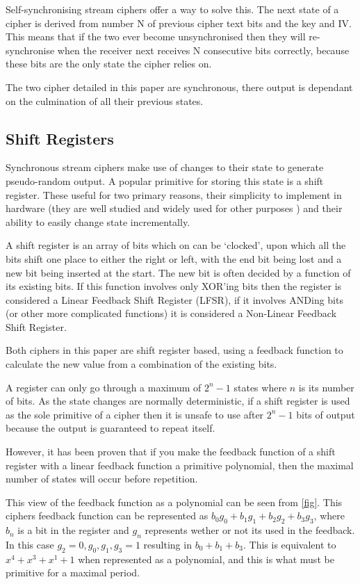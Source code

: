 \documentclass{report}
\let\Oldsubsection\subsection
\renewcommand{\subsection}{\FloatBarrier\Oldsubsection}
\begin{document}
Self-synchronising stream ciphers offer a way to solve this. The next state of a cipher is derived from number N of previous cipher text bits and the key and IV. This means that if the two ever become unsynchronised then they will re-synchronise when the receiver next receives N consecutive bits correctly, because these bits are the only state the cipher relies on.

The two cipher detailed in this paper are synchronous, there output is dependant  on the culmination of all their previous states.

\subsection*{Shift Registers}
Synchronous stream ciphers make use of changes to their state to generate pseudo-random output. A popular primitive for storing this state is a shift register. These useful for two primary reasons, their simplicity to implement in hardware (they are well studied and widely used for other purposes\cite{}
) and their ability to easily change state incrementally.

A shift register is an array of bits which on can be `clocked', upon which all the bits shift one place to either the right or left, with the end bit being lost and a new bit being inserted at the start. The new bit is often decided by a function of its existing bits. If this function involves only XOR'ing bits then the register is considered a Linear Feedback Shift Register (LFSR), if it involves ANDing bits (or other more complicated functions) it is considered a Non-Linear Feedback Shift Register.

Both ciphers in this paper are shift register based, using a feedback function to calculate the new value from a combination of the existing bits.

A register can only go through a maximum of $2^n-1$ states where $n$ is its number of bits. As the state changes are normally deterministic, if a shift register is used as the sole primitive of a cipher then it is unsafe to use after $2^n-1$ bits of output because the output is guaranteed to repeat itself.

However, it has been proven that if you make the feedback function of a shift register with a linear feedback function a primitive polynomial, then the maximal number of states will occur before repetition.

This view of the feedback function as a polynomial can be seen from \ref{fig}. This ciphers feedback function can be represented as  $b_0g_0+b_1g_1+b_2g_2+b_3g_3$, where $b_n$ is a bit in the register and $g_n$ represents wether or not its used in the feedback. In this case $g_2 = 0, g_0, g_1, g_3 = 1$ resulting in $b_0+b_1+b_3$. This is equivalent to $x^4+x^3+x^1+1$ when represented as a polynomial, and this is what must be primitive for a maximal period.
\end{document}
